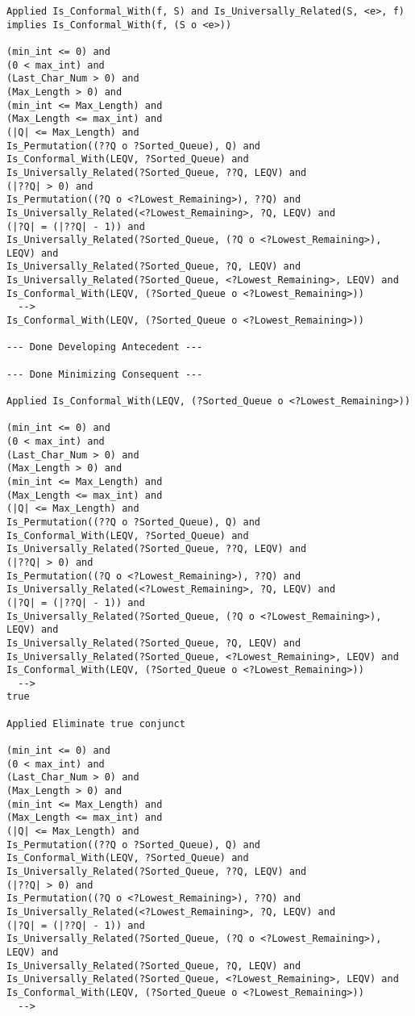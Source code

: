 \begin{lstlisting}[language=resolve]
Applied Is_Conformal_With(f, S) and Is_Universally_Related(S, <e>, f) implies Is_Conformal_With(f, (S o <e>))

(min_int <= 0) and
(0 < max_int) and
(Last_Char_Num > 0) and
(Max_Length > 0) and
(min_int <= Max_Length) and
(Max_Length <= max_int) and
(|Q| <= Max_Length) and
Is_Permutation((??Q o ?Sorted_Queue), Q) and
Is_Conformal_With(LEQV, ?Sorted_Queue) and
Is_Universally_Related(?Sorted_Queue, ??Q, LEQV) and
(|??Q| > 0) and
Is_Permutation((?Q o <?Lowest_Remaining>), ??Q) and
Is_Universally_Related(<?Lowest_Remaining>, ?Q, LEQV) and
(|?Q| = (|??Q| - 1)) and
Is_Universally_Related(?Sorted_Queue, (?Q o <?Lowest_Remaining>), LEQV) and
Is_Universally_Related(?Sorted_Queue, ?Q, LEQV) and
Is_Universally_Related(?Sorted_Queue, <?Lowest_Remaining>, LEQV) and
Is_Conformal_With(LEQV, (?Sorted_Queue o <?Lowest_Remaining>))
  -->
Is_Conformal_With(LEQV, (?Sorted_Queue o <?Lowest_Remaining>))

--- Done Developing Antecedent ---

--- Done Minimizing Consequent ---

Applied Is_Conformal_With(LEQV, (?Sorted_Queue o <?Lowest_Remaining>))

(min_int <= 0) and
(0 < max_int) and
(Last_Char_Num > 0) and
(Max_Length > 0) and
(min_int <= Max_Length) and
(Max_Length <= max_int) and
(|Q| <= Max_Length) and
Is_Permutation((??Q o ?Sorted_Queue), Q) and
Is_Conformal_With(LEQV, ?Sorted_Queue) and
Is_Universally_Related(?Sorted_Queue, ??Q, LEQV) and
(|??Q| > 0) and
Is_Permutation((?Q o <?Lowest_Remaining>), ??Q) and
Is_Universally_Related(<?Lowest_Remaining>, ?Q, LEQV) and
(|?Q| = (|??Q| - 1)) and
Is_Universally_Related(?Sorted_Queue, (?Q o <?Lowest_Remaining>), LEQV) and
Is_Universally_Related(?Sorted_Queue, ?Q, LEQV) and
Is_Universally_Related(?Sorted_Queue, <?Lowest_Remaining>, LEQV) and
Is_Conformal_With(LEQV, (?Sorted_Queue o <?Lowest_Remaining>))
  -->
true

Applied Eliminate true conjunct

(min_int <= 0) and
(0 < max_int) and
(Last_Char_Num > 0) and
(Max_Length > 0) and
(min_int <= Max_Length) and
(Max_Length <= max_int) and
(|Q| <= Max_Length) and
Is_Permutation((??Q o ?Sorted_Queue), Q) and
Is_Conformal_With(LEQV, ?Sorted_Queue) and
Is_Universally_Related(?Sorted_Queue, ??Q, LEQV) and
(|??Q| > 0) and
Is_Permutation((?Q o <?Lowest_Remaining>), ??Q) and
Is_Universally_Related(<?Lowest_Remaining>, ?Q, LEQV) and
(|?Q| = (|??Q| - 1)) and
Is_Universally_Related(?Sorted_Queue, (?Q o <?Lowest_Remaining>), LEQV) and
Is_Universally_Related(?Sorted_Queue, ?Q, LEQV) and
Is_Universally_Related(?Sorted_Queue, <?Lowest_Remaining>, LEQV) and
Is_Conformal_With(LEQV, (?Sorted_Queue o <?Lowest_Remaining>))
  -->



\end{lstlisting}
